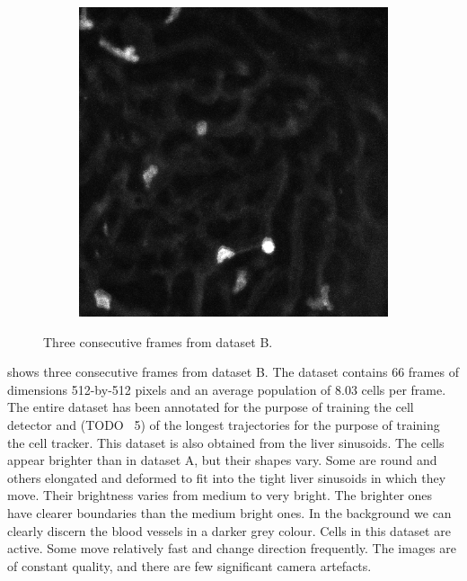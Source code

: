 \begin{figure}[h]
\begin{subfigure}{.32\textwidth}
		\end{subfigure}
		\hfill
		\begin{subfigure}{.32\textwidth}
		\includegraphics[width=\textwidth]{images/series30red025}
		\end{subfigure}
		\caption{Three consecutive frames from dataset B.}
		\label{fig:data_datasetB}
	\end{figure}
		
	 shows three consecutive frames from dataset B. The dataset contains 66 frames of dimensions 512-by-512 pixels and an average population of 8.03 cells per frame. The entire dataset has been annotated for the purpose of training the cell detector and (TODO ~5) of the longest trajectories for the purpose of training the cell tracker. This dataset is also obtained from the liver sinusoids. The cells appear brighter than in dataset A, but their shapes vary. Some are round and others elongated and deformed to fit into the tight liver sinusoids in which they move. Their brightness varies from medium to very bright. The brighter ones have clearer boundaries than the medium bright ones. In the background we can clearly discern the blood vessels in a darker grey colour. Cells in this dataset are active. Some move relatively fast and change direction frequently. The images are of constant quality, and there are few significant camera artefacts.

